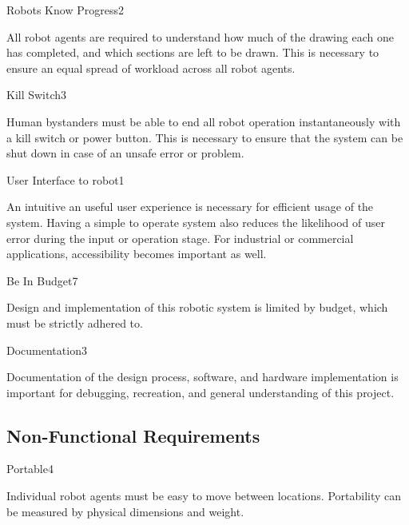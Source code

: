 \begin{functional_requirement}{Robots Know Progress}{2}
\item All robot agents are required to understand how much of the drawing each one has completed, and which sections are left to be drawn. This is necessary to ensure an equal spread of workload across all robot agents.
\end{functional_requirement}

\begin{functional_requirement}{Kill Switch}{3}
\item Human bystanders must be able to end all robot operation instantaneously with a kill switch or power button. This is necessary to ensure that the system can be shut down in case of an unsafe error or problem.
\end{functional_requirement}

\begin{functional_requirement}{User Interface to robot}{1}
\item An intuitive an useful user experience is necessary for efficient usage of the system. Having a simple to operate system also reduces the likelihood of user error during the input or operation stage. For industrial or commercial applications, accessibility becomes important as well. 
\end{functional_requirement}

\begin{functional_requirement}{Be In Budget}{7}
\item Design and implementation of this robotic system is limited by budget, which must be strictly adhered to.
\end{functional_requirement}

\begin{functional_requirement}{Documentation}{3}
\item Documentation of the design process, software, and hardware implementation is important for debugging, recreation, and general understanding of this project.
\end{functional_requirement}


\subsection{Non-Functional Requirements}
\label{sec:nonfunctional_requirements}

\begin{nonfunctional_requirement}{Portable}{4}
\item Individual robot agents must be easy to move between locations. Portability can be measured by physical dimensions and weight.
\end{nonfunctional_requirement}

